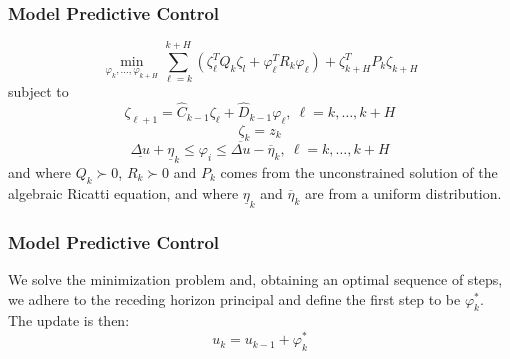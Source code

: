 \documentclass[
    aspectratio=169,
    \ifdefined\HANDOUT
    handout
    \else
    \fi
]{beamer}
\begin{document}
\begin{frame}
    \frametitle{Model Predictive Control}
    \begin{equation*}
        \label{eq:mpc}
        \min_{\varphi_k,\ldots,\varphi_{k+H}}\sum_{\ell=k}^{k+H}\left(
        \zeta_{\ell}^T Q_{k}\zeta_l+\varphi_\ell^TR_k\varphi_\ell
        \right)
        + \zeta_{k+H}^T P_{k}\zeta_{k+H}
    \end{equation*}
    subject to
    \begin{equation*}
        \zeta_{\ell+1} = \hat{C}_{k-1}\zeta_\ell +\hat{D}_{k-1}\varphi_\ell,\   \ell=k,\ldots,k+H
    \end{equation*}
    \begin{equation*}
        \zeta_k = z_k
    \end{equation*}
    \begin{equation*}
        \underline{\Delta u} + \underline{\eta}_k \leq \varphi_i \leq \overline{\Delta u}-\overline{\eta}_k,\   \ell=k,\ldots,k+H
    \end{equation*}
    and where $Q_k\succ 0$, $R_k\succ 0$ and $P_k$ comes from the unconstrained
    solution of the algebraic Ricatti equation, and where $\underline{\eta}_k$
    and $\overline{\eta}_k$ are from a uniform distribution.

\end{frame}
\begin{frame}
    \frametitle{Model Predictive Control}
    We solve the minimization problem and, obtaining an optimal sequence of steps,
    we adhere to the receding horizon principal and define the first step to be $\varphi_{k}^*$.
    The update is then:
    \begin{equation*}
        u_k = u_{k-1} + \varphi_k^*
    \end{equation*}
\end{frame}
\end{document}
